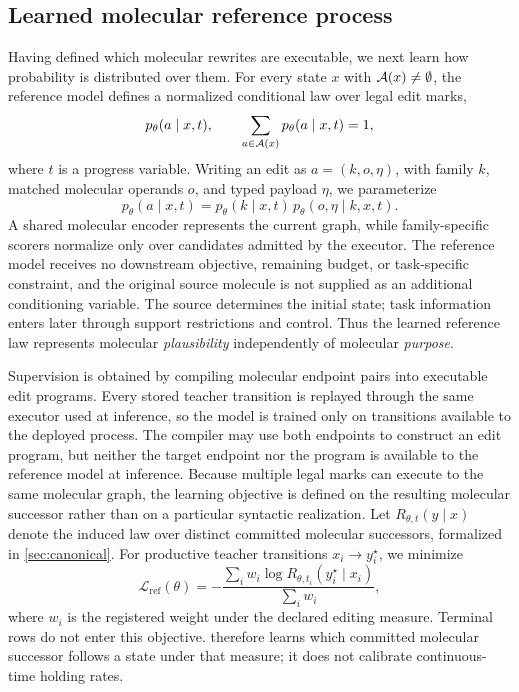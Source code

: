 \subsection{Learned molecular reference process}
\label{sec:rtheta}

Having defined which molecular rewrites are executable, we next learn how probability is distributed over them. For every state $x$ with $\mathcal{A}(x)\neq\emptyset$, the reference model defines a normalized conditional law over legal edit marks,
\begin{equation}
p_\theta(a\mid x,t),\qquad\sum_{a\in\mathcal{A}(x)}p_\theta(a\mid x,t)=1,
\label{eq:marklaw}
\end{equation}
where $t$ is a progress variable. Writing an edit as $a=(k,o,\eta)$, with family $k$, matched molecular operands $o$, and typed payload $\eta$, we parameterize
\begin{equation}
p_\theta(a\mid x,t)=p_\theta(k\mid x,t)\,p_\theta(o,\eta\mid k,x,t).
\label{eq:hierarchical}
\end{equation}
A shared molecular encoder represents the current graph, while family-specific scorers normalize only over candidates admitted by the executor. The reference model receives no downstream objective, remaining budget, or task-specific constraint, and the original source molecule is not supplied as an additional conditioning variable. The source determines the initial state; task information enters later through support restrictions and control. Thus the learned reference law represents molecular \emph{plausibility} independently of molecular \emph{purpose}.

Supervision is obtained by compiling molecular endpoint pairs into executable edit programs. Every stored teacher transition is replayed through the same executor used at inference, so the model is trained only on transitions available to the deployed process. The compiler may use both endpoints to construct an edit program, but neither the target endpoint nor the program is available to the reference model at inference. Because multiple legal marks can execute to the same molecular graph, the learning objective is defined on the resulting molecular successor rather than on a particular syntactic realization. Let $R_{\theta,t}(y\mid x)$ denote the induced law over distinct committed molecular successors, formalized in \cref{sec:canonical}. For productive teacher transitions $x_i\rightarrow y^{\star}_i$, we minimize
\begin{equation}
\mathcal{L}_{\mathrm{ref}}(\theta)=-\frac{\sum_i w_i\log R_{\theta,t_i}(y^{\star}_i\mid x_i)}{\sum_i w_i},
\label{eq:refloss}
\end{equation}
where $w_i$ is the registered weight under the declared editing measure. Terminal rows do not enter this objective.  therefore learns which committed molecular successor follows a state under that measure; it does not calibrate continuous-time holding rates.

